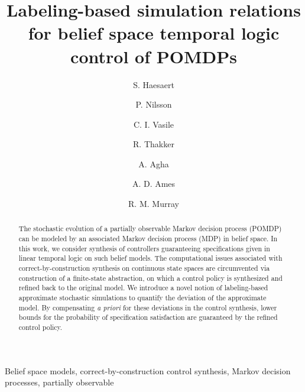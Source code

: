 \documentclass{ifacconf}
\begin{document}
\begin{frontmatter}

\title{Labeling-based simulation relations for belief space temporal logic control of POMDPs}

\author[cal]{S. Haesaert}
\author[cal]{P. Nilsson}
\author[mit]{C. I. Vasile}
\author[jpl]{R. Thakker}
\author[jpl]{A. Agha}
\author[cal]{A. D.  Ames}
\author[cal]{R. M. Murray}



\address[cal]{California Institute of Technology,
   Pasadena, CA 91125 USA} %
\address[mit]{Massachusetts Institute of Technology,
   Cambridge, MA 02139 USA}%
\address[jpl]{Jet Propulsion Laboratory,
   Pasadena, CA 91109 USA}%
\maketitle
\begin{abstract}
The stochastic evolution of a partially observable Markov decision process (POMDP) can be modeled by an associated Markov decision process (MDP) in belief space.
In this work, we consider synthesis of controllers guaranteeing  specifications given in linear temporal logic on such belief models. The computational issues associated with correct-by-construction synthesis on continuous state spaces are circumvented via construction of a finite-state abstraction, on which a control policy is synthesized and refined back to the original model. We introduce a novel notion of labeling-based approximate stochastic simulations to quantify the deviation of the approximate model. By compensating {\it a priori} for these deviations in the control synthesis, lower bounds for the probability of specification satisfaction are guaranteed by the refined control policy.
\end{abstract}
\begin{keyword} Belief space models,
correct-by-construction control synthesis, Markov decision processes, partially observable
\end{keyword}

\end{frontmatter}
\end{document}
